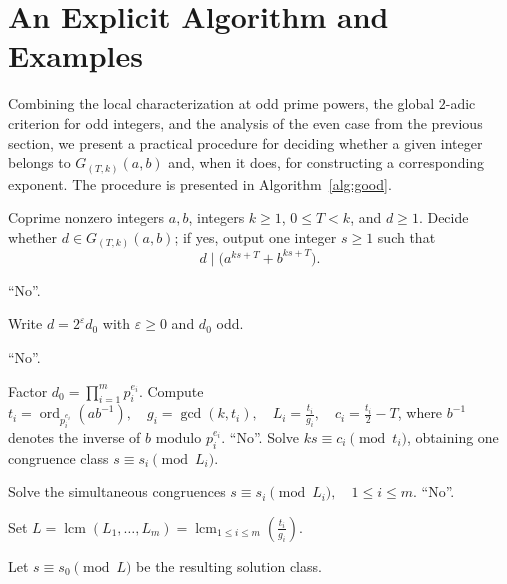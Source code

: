 \documentclass[pdflatex,sn-mathphys-num]{sn-jnl}%
\theoremstyle{thmstyleone}%
\theoremstyle{thmstyletwo}%
\theoremstyle{thmstylethree}%
\newcommand{\ord}{\operatorname{ord}}
\newcommand{\lcm}{\operatorname{lcm}}
\begin{document}
 

\section{An Explicit Algorithm and Examples} \label{sec3}
Combining the local characterization at odd prime powers, the global $2$-adic criterion for odd integers, and the analysis of the even case from the previous section, we present  a practical procedure for deciding whether a given integer belongs to $G_{(T,k)}(a,b)$ and, when it does, for constructing a corresponding exponent. The procedure is presented in Algorithm~\ref{alg:good}.

\begin{algorithm}[!hbt]  
\caption{Determine whether $d\in G_{(T,k)}(a,b)$ and compute an exponent}
\label{alg:good}

 \small
\begin{algorithmic}[1]
\Require Coprime nonzero integers $a,b$, integers $k\ge 1$, $0\le T<k$, and $d\ge 1$.
\Ensure Decide whether $d\in G_{(T,k)}(a,b)$; if yes, output one integer $s\ge 1$ such that
\[
d\mid \bigl(a^{ks+T}+b^{ks+T}\bigr).\]

  \State \Return ``No''.
\EndIf

\State Write
$
d=2^\varepsilon d_0$
with $\varepsilon\ge 0$ and $d_0$ odd.

  \State \Return ``No''.
\EndIf

  \State Factor
  $
  d_0=\prod_{i=1}^m p_i^{e_i}$.
    \State Compute
    $
    t_i=\ord_{p_i^{e_i}}(ab^{-1}),
    \quad
    g_i=\gcd(k,t_i),
    \quad
    L_i=\frac{t_i}{g_i},
    \quad
    c_i=\frac{t_i}{2}-T$,
    where $b^{-1}$ denotes the inverse of $b$ modulo $p_i^{e_i}$.
      \State \Return ``No''.
    \EndIf
    \State Solve
    $
    ks\equiv c_i \pmod{t_i}$,
    obtaining one congruence class
    $
    s\equiv s_i \pmod{L_i}$.
  \EndFor

  \State Solve the simultaneous congruences
  $
  s\equiv s_i \pmod{L_i},
  \quad 1\le i\le m$.
    \State \Return ``No''.
  \EndIf

  \State Set
  $
  L=\lcm(L_1,\dots,L_m)
  =
  \lcm_{1\le i\le m}\left(\frac{t_i}{g_i}\right)$.
  
  \State Let
  $
  s\equiv s_0 \pmod L$
  be the resulting solution class.


\end{algorithmic}
\end{algorithm}
\end{document}
